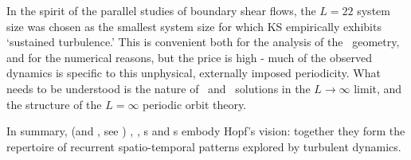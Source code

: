 In the spirit of the parallel studies of boundary shear flows,
the {\KS} $L=22$ system size was chosen as the smallest
system size for which KS empirically exhibits
`sustained turbulence.'
This is convenient both for
the analysis of the \statesp\ geometry, and for the numerical reasons,
 but the price is high - much of the
observed dynamics is specific to this unphysical, externally
imposed periodicity. What needs to be
understood is the nature of \eqv\ and \rpo\ solutions in the
$L \to \infty$ limit, and the structure of the $L = \infty$ periodic orbit
theory.

In summary, {\KS} (and \pCf, see )  \eqva, \reqva, \po s and
\rpo s embody Hopf's vision: together they form the
 repertoire of recurrent spatio-temporal
patterns explored by turbulent dynamics.
